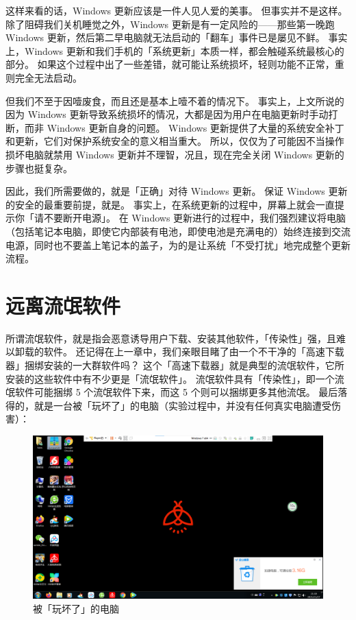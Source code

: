 这样来看的话，Windows 更新应该是一件人见人爱的美事。
但事实并不是这样。
除了阻碍我们关机睡觉之外，Windows 更新是有一定风险的——那些第一晚跑 Windows 更新，然后第二早电脑就无法启动的「翻车」事件已是屡见不鲜。
事实上，Windows 更新和我们手机的「系统更新」本质一样，都会触碰系统最核心的部分。
如果这个过程中出了一些差错，就可能让系统损坏，轻则功能不正常，重则完全无法启动。

但我们不至于因噎废食，而且还是基本上噎不着的情况下。
事实上，上文所说的因为 Windows 更新导致系统损坏的情况，大都是因为用户在电脑更新时手动打断，而非 Windows 更新自身的问题。
Windows 更新提供了大量的系统安全补丁和更新，它们对保护系统安全的意义相当重大。
所以，仅仅为了可能因不当操作损坏电脑就禁用 Windows 更新并不理智，况且，现在完全关闭 Windows 更新的步骤也挺复杂。

因此，我们所需要做的，就是「正确」对待 Windows 更新。
保证 Windows 更新的安全的最重要前提，就是。
事实上，在系统更新的过程中，屏幕上就会一直提示你「请不要断开电源」。
在 Windows 更新进行的过程中，我们强烈建议将电脑（包括笔记本电脑，即使它内部装有电池，即使电池是充满电的）始终连接到交流电源，同时也不要盖上笔记本的盖子，为的是让系统「不受打扰」地完成整个更新流程。

\section{远离流氓软件}

所谓流氓软件，就是指会恶意诱导用户下载、安装其他软件，「传染性」强，且难以卸载的软件。
还记得在上一章中，我们亲眼目睹了由一个不干净的「高速下载器」捆绑安装的一大群软件吗？
这个「高速下载器」就是典型的流氓软件，它所安装的这些软件中有不少更是「流氓软件」。
流氓软件具有「传染性」，即一个流氓软件可能捆绑 5 个流氓软件下来，而这 5 个则可以捆绑更多其他流氓。
最后落得的，就是一台被「玩坏了」的电脑（实验过程中，并没有任何真实电脑遭受伤害）：

\begin{figure}[htb!]
  \centering
  \includegraphics[width=12cm]{assets/Computer_In_A_Mess.png}
  \caption{被「玩坏了」的电脑}
  \label{Computer_In_A_Mess}
\end{figure}

